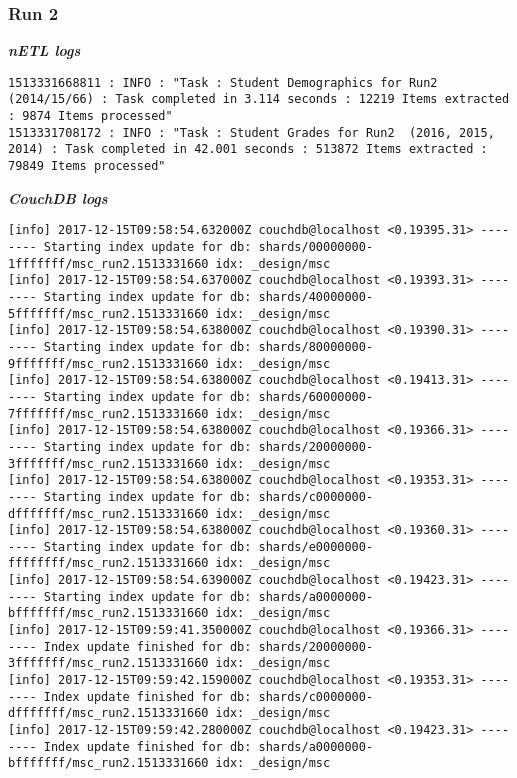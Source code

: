 \subsubsection{Run 2}
\textit{\textbf{nETL logs}}
\begin{verbatim}
1513331668811 : INFO : "Task : Student Demographics for Run2 (2014/15/66) : Task completed in 3.114 seconds : 12219 Items extracted : 9874 Items processed"
1513331708172 : INFO : "Task : Student Grades for Run2  (2016, 2015, 2014) : Task completed in 42.001 seconds : 513872 Items extracted : 79849 Items processed"
\end{verbatim}

\textit{\textbf{CouchDB logs}}
\begin{verbatim}
[info] 2017-12-15T09:58:54.632000Z couchdb@localhost <0.19395.31> -------- Starting index update for db: shards/00000000-1fffffff/msc_run2.1513331660 idx: _design/msc
[info] 2017-12-15T09:58:54.637000Z couchdb@localhost <0.19393.31> -------- Starting index update for db: shards/40000000-5fffffff/msc_run2.1513331660 idx: _design/msc
[info] 2017-12-15T09:58:54.638000Z couchdb@localhost <0.19390.31> -------- Starting index update for db: shards/80000000-9fffffff/msc_run2.1513331660 idx: _design/msc
[info] 2017-12-15T09:58:54.638000Z couchdb@localhost <0.19413.31> -------- Starting index update for db: shards/60000000-7fffffff/msc_run2.1513331660 idx: _design/msc
[info] 2017-12-15T09:58:54.638000Z couchdb@localhost <0.19366.31> -------- Starting index update for db: shards/20000000-3fffffff/msc_run2.1513331660 idx: _design/msc
[info] 2017-12-15T09:58:54.638000Z couchdb@localhost <0.19353.31> -------- Starting index update for db: shards/c0000000-dfffffff/msc_run2.1513331660 idx: _design/msc
[info] 2017-12-15T09:58:54.638000Z couchdb@localhost <0.19360.31> -------- Starting index update for db: shards/e0000000-ffffffff/msc_run2.1513331660 idx: _design/msc
[info] 2017-12-15T09:58:54.639000Z couchdb@localhost <0.19423.31> -------- Starting index update for db: shards/a0000000-bfffffff/msc_run2.1513331660 idx: _design/msc
[info] 2017-12-15T09:59:41.350000Z couchdb@localhost <0.19366.31> -------- Index update finished for db: shards/20000000-3fffffff/msc_run2.1513331660 idx: _design/msc
[info] 2017-12-15T09:59:42.159000Z couchdb@localhost <0.19353.31> -------- Index update finished for db: shards/c0000000-dfffffff/msc_run2.1513331660 idx: _design/msc
[info] 2017-12-15T09:59:42.280000Z couchdb@localhost <0.19423.31> -------- Index update finished for db: shards/a0000000-bfffffff/msc_run2.1513331660 idx: _design/msc

\end{verbatim}
